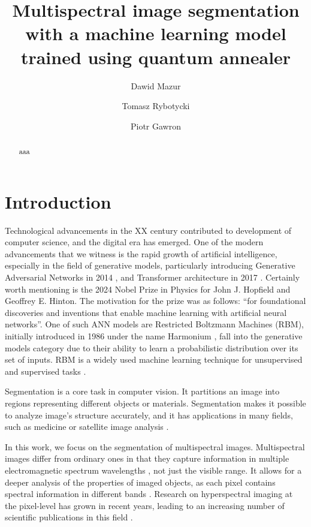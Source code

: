 \documentclass[a4paper,12pt]{article}
\title{Multispectral image segmentation with a machine learning model trained using quantum annealer}
\author{Dawid Mazur \and Tomasz Rybotycki \and Piotr Gawron}
\begin{document}
\maketitle

\begin{abstract}
	aaa
\end{abstract}

\section{Introduction}\label{introduction}

Technological advancements in the XX century contributed to development of computer science, and the digital era has emerged. One of the modern advancements that we witness is the rapid growth of artificial intelligence, especially in the field of generative models, particularly introducing Generative Adversarial Networks in 2014 \cite{Goodfellow2014}, and Transformer architecture in  2017 \cite{Vaswani2023}. Certainly worth mentioning is the 2024 Nobel Prize in Physics for John J. Hopfield and Geoffrey E. Hinton. The motivation for the prize was as follows: ``for foundational discoveries and inventions that enable machine learning with artificial neural networks''. One of such ANN models are Restricted Boltzmann Machines (RBM), initially introduced in 1986 under the name Harmonium \cite{Smolensky1986}, fall into the generative models category due to their ability to learn a probabilistic distribution over its set of inputs. RBM is a widely used machine learning technique for unsupervised \cite{Decelle2023} and supervised tasks \cite{Dixit2021RBM_DWave}.

Segmentation is a core task in computer vision. It partitions an image into regions representing different objects or materials. Segmentation makes it possible to analyze image's structure accurately, and it has applications in many fields, such as medicine \cite{Wang2022} or satellite image analysis \cite{fajtl2020}.

In this work, we focus on the segmentation of multispectral images. Multispectral images differ from ordinary ones in that they capture information in multiple electromagnetic spectrum wavelengths \cite{Mengu2023}, not just the visible range. It allows for a deeper analysis of the properties of imaged objects, as each pixel contains spectral information in different bands \cite{Sifnaios2024}. Research on hyperspectral imaging at the pixel-level has grown in recent years, leading to an increasing number of scientific publications in this field \cite{Morchhale2016, González-Santiago2022, Yan2023, Sifnaios2024, Chen2024}.
\end{document}
